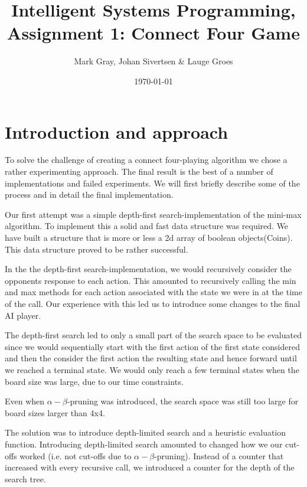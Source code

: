 \documentclass[11pt, a4paper]{article}
\author{Mark Gray, Johan Sivertsen \& Lauge Groes}
\title{Intelligent Systems Programming, Assignment 1: Connect Four Game}
\date{\today}
\begin{document}
\maketitle
\newpage
\section*{Introduction and approach}

To solve the challenge of creating a connect four-playing algorithm we chose a rather experimenting approach. The final result is the best of a number of implementations and failed experiments. We will first briefly describe some of the process and in detail the final implementation.

Our first attempt was a simple depth-first search-implementation of the
mini-max algorithm. To implement this a solid and fast data structure was required. We have built a structure that is more or less a 2d array of boolean objects(Coins). This data structure proved to be rather successful.  

In the the depth-first search-implementation, we would recursively consider the
opponents response to each action. This amounted to recursively calling the min
and max methods for each action associated with the state we were in at the time
of the call. Our experience with this led us to introduce some changes to the final AI
player.

The depth-first search led to only a small part of the search space to be
evaluated since we would sequentially start with the first action of the first
state considered and then the consider the first action the resulting state and hence forward until
we reached a terminal state. We would only reach a few terminal states when the
board size was large, due to our time constraints.

Even when $\alpha-\beta$-pruning was introduced, the search space was still too
large for board sizes larger than 4x4.

The solution was to introduce depth-limited search and a heuristic evaluation
function. Introducing depth-limited search amounted to changed how we our
cut-offs worked (i.e. not cut-offs due to $\alpha-\beta$-pruning). Instead of a
counter that increased with every recursive call, we introduced a counter for
the depth of the search tree.
\end{document}
